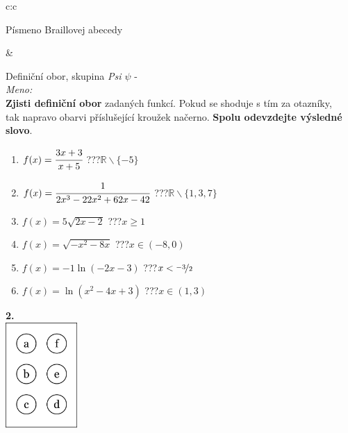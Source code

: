 \documentclass[10pt]{report}
\begin{document}
\begin{tabular}{c:c}
\begin{minipage}[c][99mm][t]{0.49\linewidth}
\begin{center}
\begin{minipage}{0.20\linewidth}
\begin{center}
{\small Písmeno Braillovej abecedy}
\end{center}
\end{minipage}
\end{center}
\end{minipage}
&
\begin{minipage}[c][99mm][t]{0.49\linewidth}
\begin{center}
\vspace{7mm}
{\huge Definiční obor, skupina \textit{Psi $\psi$} -}\\[4.5mm]
\textit{Meno:}\phantom{xxxxxxxxxxxxxxxxxxxxxxxxxxxxxxxxxxxxxxxxxxxxxxxxxxxxxxxxxxxxxxxxx}\\[3.5mm]
\textbf{Zjisti definiční obor} zadaných funkcí. Pokud se shoduje s tím za otazníky,\\tak napravo obarvi příslušející kroužek načerno. \textbf{Spolu odevzdejte výsledné slovo}.\\[3mm]
\begin{minipage}{0.77\linewidth}
\begin{center}
\begin{varwidth}{\textwidth}
\begin{enumerate}
\normalsize
\item $f(x)=\cfrac{3x+3}{x+5}$\quad \dotfill\; ???\;\dotfill \quad $\mathbb{R}\smallsetminus\{-5\}$
\item $f(x)=\cfrac{1}{2x^3-22x^2+62x-42}$\quad \dotfill\; ???\;\dotfill \quad $\mathbb{R}\smallsetminus\{1,3,7\}$
\item $f(x)=5\sqrt{2x-2}$\quad \dotfill\; ???\;\dotfill \quad $x\geq1$
\item $f(x)=\sqrt{-x^2-8x}$\quad \dotfill\; ???\;\dotfill \quad $x\in(-8 , 0)$
\item $f(x)=-1\ln{(-2x-3)}$\quad \dotfill\; ???\;\dotfill \quad $x<\nicefrac{-3}{2}$
\item $f(x)=\ln{(x^2-4x+3)}$\quad \dotfill\; ???\;\dotfill \quad $x\in(1 , 3)$
\end{enumerate}
\end{varwidth}
\end{center}
\end{minipage}
\begin{minipage}{0.20\linewidth}
\begin{center}
{\Huge\bfseries 2.} \\[2mm]
\includegraphics[height=40mm]{../images/braille.png}

\end{center}
\end{minipage}
\end{center}
\end{minipage}
\end{tabular}
\end{document}
